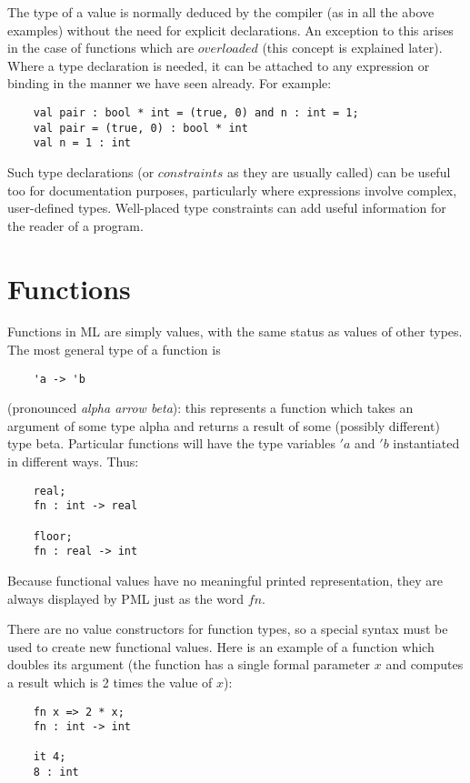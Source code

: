 The type of a value is normally deduced by the compiler (as in all the
above examples) without the need for explicit declarations. An exception
to this arises in the case of functions which are $overloaded$ (this
concept is explained later). Where a type declaration is needed, it can
be attached to any expression or binding in the manner we have seen
already. For example:
\begin{verbatim}
    val pair : bool * int = (true, 0) and n : int = 1;
    val pair = (true, 0) : bool * int
    val n = 1 : int
\end{verbatim}

Such type declarations (or $constraints$ as they are usually called) can
be useful too for documentation purposes, particularly where expressions
involve complex, user-defined types. Well-placed type constraints can
add useful information for the reader of a program.


\section{Functions}

Functions in ML are simply values, with the same status as values of
other types. The most general type of a function is
\begin{verbatim}
    'a -> 'b
\end{verbatim}

(pronounced {\em alpha arrow beta}): this represents a function which takes
an argument of some type alpha and returns a result of some (possibly
different) type beta. Particular functions will have the type variables
$'a$ and $'b$ instantiated in different ways. Thus:
\begin{verbatim}
    real;
    fn : int -> real

    floor;
    fn : real -> int
\end{verbatim}

Because functional values have no meaningful printed representation,
they are always displayed by PML just as the word $fn$.

There are no value constructors for function types, so a special syntax
must be used to create new functional values. Here is an example of a
function which doubles its argument (the function has a single formal
parameter $x$ and computes a result which is 2 times the value of $x$):
\begin{verbatim}
    fn x => 2 * x;
    fn : int -> int

    it 4;
    8 : int
\end{verbatim}

